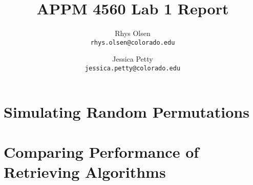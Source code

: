 \usepackage{amsmath}
\title{APPM 4560 Lab 1 Report}
\usepackage[T1]{fontenc}
\usepackage{babel}
\author{
  Rhys Olsen\\
  \texttt{rhys.olsen@colorado.edu}
  \and
  Jessica Petty\\
  \texttt{jessica.petty@colorado.edu}
}

\section{Simulating Random Permutations}
\section{Comparing Performance of Retrieving Algorithms}

